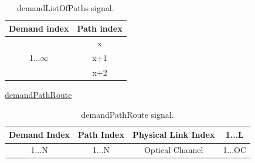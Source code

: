 \begin{table}[H]
	\centering
	\begin{tabular}{|c|c|l|l|}
		\hline
		Demand index           & \multicolumn{3}{c|}{Path index} \\ \hline
		\multirow{3}{*}{1...$\infty$} & \multicolumn{3}{c|}{x}          \\ \cline{2-4}
		& \multicolumn{3}{c|}{x+1}        \\ \cline{2-4}
		& \multicolumn{3}{c|}{x+2}        \\ \hline
	\end{tabular}
	\caption{demandListOfPaths signal.}
	\label{demandListOfPaths_example}
\end{table}

\underline{demandPathRoute}\\
\begin{table}[H]
	\centering
	\begin{tabular}{|c|c|c|c|}
		\hline
		Demand Index           & Path Index             & Physical Link Index                       & 1...L                   \\ \hline
		\multirow{2}{*}{1...N} & \multirow{2}{*}{1...N} & \multirow{2}{*}{Optical Channel} & \multirow{2}{*}{1...OC} \\
		&                        &                                  &                          \\ \hline
	\end{tabular}
	\caption{demandPathRoute signal.}
	\label{demandPathRoute_signal}
\end{table}

